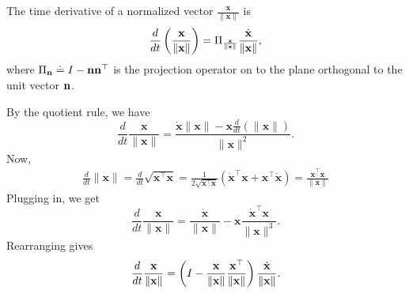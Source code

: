 \begin{property} \label{prop:derivative_of_normal_vector}
	The time derivative of a normalized vector $\frac{\mathbf{x}}{\|\mathbf{x}\|}$ is
	\begin{equation}
		\label{eq:norm_derivative}
		\frac{d}{dt} \left(\frac{\xbf}{\norm{\xbf}}\right) = \Pi_{\frac{\xbf}{\norm{\xbf}}} \frac{\dot{\xbf}}{\norm{\xbf}},
	\end{equation}
	where $\Pi_{\mathbf{n}} \doteq I-\mathbf{n}\mathbf{n}^\top$ is the projection operator on to the plane orthogonal to the unit vector $\mathbf{n}$.
\end{property}
\proof
	By the quotient rule, we have
	\begin{equation}
		\frac{d}{dt} \frac{\mathbf{x}}{\|\mathbf{x}\|} = \frac{\dot{\mathbf{x}} \|\mathbf{x}\| - \mathbf{x} \frac{d}{dt}(\|\mathbf{x}\|)}{\|\mathbf{x}\|^2}.
	\end{equation}
	Now,
	\begin{align}
		\frac{d}{dt} \|\mathbf{x}\| 
		= \frac{d}{dt} \sqrt{\mathbf{x}^\top \mathbf{x}} 
		= \frac{1}{2 \sqrt{\mathbf{x}^\top \mathbf{x}}} (\dot{\mathbf{x}}^\top \mathbf{x} + \mathbf{x}^\top \dot{\mathbf{x}})
		= \frac{\dot{\mathbf{x}}^\top \mathbf{x}}{\|\mathbf{x}\|}
	\end{align}
	Plugging in, we get
	\begin{equation}
		\frac{d}{dt} \frac{\mathbf{x}}{\|\mathbf{x}\|} = \frac{\dot{\mathbf{x}}}{\|\mathbf{x}\|} - \mathbf{x} \frac{\dot{\mathbf{x}}^\top \mathbf{x}}{\|\mathbf{x}\|^3}.
	\end{equation}
	Rearranging gives
	\[
	\frac{d}{dt} \frac{\mathbf{x}}{\|\mathbf{x}\|} =  \left(I-\frac{\mathbf{x}}{\left\|\mathbf{x}\right\|}\frac{\mathbf{x}^\top}{\left\|\mathbf{x}\right\|}\right)\frac{\dot{\mathbf{x}}}{\left\|\mathbf{x}\right\|}.
	\]

\endproof

